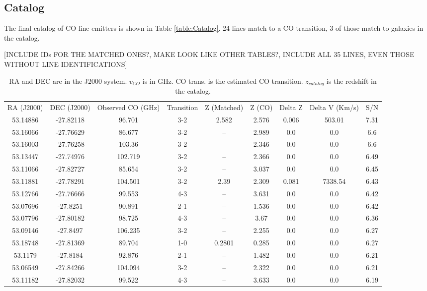 \subsection{Catalog}

The final catalog of CO line emitters is shown in Table \ref{table:Catalog}. 24 lines match to a CO transition, 3 of those match to galaxies in the catalog.

[INCLUDE IDs FOR THE MATCHED ONES?, MAKE LOOK LIKE OTHER TABLES?, INCLUDE ALL 35 LINES, EVEN THOSE WITHOUT LINE IDENTIFICATIONS]

\begin{table}
\centering
\caption{RA and DEC are in the J2000 system. $v_{CO}$ is in GHz. CO trans. is the estimated CO transition. $z_{catalog}$ is the redshift in the catalog. }
\begin{tabular}{ccccccccc}
RA (J2000) & DEC (J2000) & Observed CO (GHz) & Transition & Z (Matched) & Z (CO) & Delta Z & Delta V (Km/s) & S/N \\
53.14886 & -27.82118 & 96.701 & 3-2 & 2.582 & 2.576 & 0.006 & 503.01 & 7.31 \\
53.16066 & -27.76629 & 86.677 & 3-2 & -- & 2.989 & 0.0 & 0.0 & 6.6 \\
53.16003 & -27.76258 & 103.36 & 3-2 & -- & 2.346 & 0.0 & 0.0 & 6.6 \\
53.13447 & -27.74976 & 102.719 & 3-2 & -- & 2.366 & 0.0 & 0.0 & 6.49 \\
53.11066 & -27.82727 & 85.654 & 3-2 & -- & 3.037 & 0.0 & 0.0 & 6.45 \\
53.11881 & -27.78291 & 104.501 & 3-2 & 2.39 & 2.309 & 0.081 & 7338.54 & 6.43 \\
53.12766 & -27.76666 & 99.553 & 4-3 & -- & 3.631 & 0.0 & 0.0 & 6.42 \\
53.07696 & -27.8251 & 90.891 & 2-1 & -- & 1.536 & 0.0 & 0.0 & 6.42 \\
53.07796 & -27.80182 & 98.725 & 4-3 & -- & 3.67 & 0.0 & 0.0 & 6.36 \\
53.09146 & -27.8497 & 106.235 & 3-2 & -- & 2.255 & 0.0 & 0.0 & 6.27 \\
53.18748 & -27.81369 & 89.704 & 1-0 & 0.2801 & 0.285 & 0.0 & 0.0 & 6.27 \\
53.1179 & -27.8184 & 92.876 & 2-1 & -- & 1.482 & 0.0 & 0.0 & 6.21 \\
53.06549 & -27.84266 & 104.094 & 3-2 & -- & 2.322 & 0.0 & 0.0 & 6.21 \\
53.11182 & -27.82032 & 99.522 & 4-3 & -- & 3.633 & 0.0 & 0.0 & 6.19 \\

\end{tabular}
\end{table}
